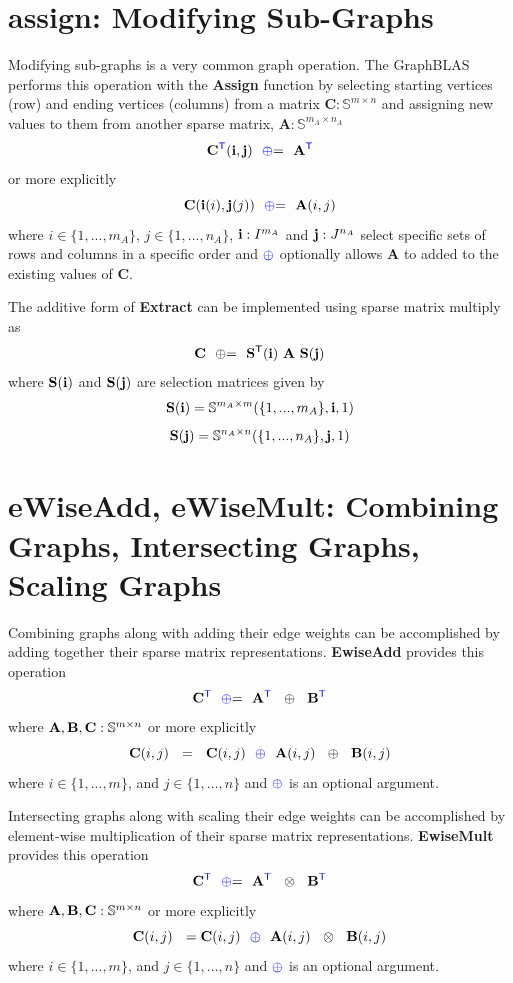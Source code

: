 \section{assign: Modifying Sub-Graphs}
  Modifying sub-graphs is a very common graph operation.  The GraphBLAS performs this operation with the {\bf Assign} function by selecting starting vertices (row) and ending vertices (columns) from a matrix $\mathbf{C} : \mathbb{S}^{m \times n}$ and assigning new values to them from another sparse matrix, $\mathbf{A} : \mathbb{S}^{m_A \times n_A}$
$$
   \mathbf{C}^{\textcolor{blue}{\sf T}}({\bf i},{\bf j}) ~~ {\textcolor{blue}{\oplus}}{=} ~~ \mathbf{A}^{\textcolor{blue}{\sf T}}
$$
or more explicitly
$$
   {\bf C}({\bf i}(i),{\bf j}(j)) ~~ {\textcolor{blue}{\oplus}}{=} ~~{\bf A}(i,j) 
$$
where $i \in \{1,...,m_A\}$, $j \in \{1,...,n_A\}$, ${\bf i} : I^{m_A}$ and ${\bf j}: J^{n_A}$ select specific sets of rows and columns in a specific order and ${\textcolor{blue}{\oplus}}$ optionally allows $\mathbf{A}$ to added to the existing values of $\mathbf{C}$. 

  The additive form of {\bf Extract} can be implemented using sparse matrix multiply as
$$
   \mathbf{C} ~~ {\oplus}{=} ~~ \mathbf{S}^{\sf T}({\bf i}) ~ \mathbf{A} ~ \mathbf{S}({\bf j})
$$
where $\mathbf{S}({\bf i})$ and $\mathbf{S}({\bf j})$ are selection matrices given by
$$
   \mathbf{S}({\bf i}) = \mathbb{S}^{m_A \times m}(\{1,...,m_A\},{\bf i},1)
$$
$$
    \mathbf{S}({\bf j}) = \mathbb{S}^{n_A \times n}(\{1,...,n_A\},{\bf j},1)
$$
  

\section{eWiseAdd, eWiseMult: Combining Graphs, Intersecting Graphs, Scaling Graphs}
  Combining graphs along with adding their edge weights can be accomplished by adding together their sparse matrix representations. {\bf EwiseAdd} provides this operation
$$
   {\bf C}^{\textcolor{blue}{\sf T}} ~~ {\textcolor{blue}{\oplus}}{=} ~~ {\bf A}^{\textcolor{blue}{\sf T}} ~~ \oplus ~~ {\bf B}^{\textcolor{blue}{\sf T}}
$$
where ${\bf A},{\bf B},{\bf C}: \mathbb{S}^{m \times n}$ or more explicitly 
$$
   {\bf C}(i,j) ~~ = ~~ {\bf C}(i,j) ~~ {\textcolor{blue}{\oplus}} ~~ {\bf A}(i,j) ~~ \oplus ~~{\bf B}(i,j)
$$
where $i \in \{1,...,m\}$, and $j \in \{1,...,n\}$ and ${\textcolor{blue}{\oplus}}$ is an optional argument. 

  Intersecting graphs along with scaling their edge weights can be accomplished by element-wise multiplication of their sparse matrix representations. {\bf EwiseMult} provides this operation
$$
   {\bf C}^{\textcolor{blue}{\sf T}} ~~ {\textcolor{blue}{\oplus}}{=} ~~ {\bf A}^{\textcolor{blue}{\sf T}} ~~ \otimes ~~ {\bf B}^{\textcolor{blue}{\sf T}}
$$
where ${\bf A},{\bf B},{\bf C}: \mathbb{S}^{m \times n}$ or more explicitly 
$$
   {\bf C}(i,j) ~~ = {\bf C}(i,j) ~~ {\textcolor{blue}{\oplus}} ~~ {\bf A}(i,j) ~~ \otimes ~~{\bf B}(i,j)
$$
where $i \in \{1,...,m\}$, and $j \in \{1,...,n\}$ and ${\textcolor{blue}{\oplus}}$ is an optional argument. 

